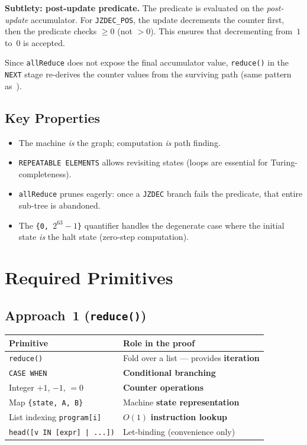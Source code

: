 \documentclass[11pt,a4paper]{article}
\begin{document}
\textbf{Subtlety: post-update predicate.}
The predicate is evaluated on the \emph{post-update} accumulator. For
\texttt{JZDEC\_POS}, the update decrements the counter first, then the
predicate checks $\geq 0$ (not $> 0$). This ensures that decrementing
from~$1$ to~$0$ is accepted.

Since \texttt{allReduce} does not expose the final accumulator value,
\texttt{reduce()} in the \texttt{NEXT} stage re-derives the counter
values from the surviving path
(same pattern as~\cite{evblog}).

\subsection{Key Properties}

\begin{itemize}[leftmargin=1.5em]
  \item The machine \emph{is} the graph; computation \emph{is} path finding.
  \item \texttt{REPEATABLE ELEMENTS} allows revisiting states (loops are
        essential for Turing-completeness).
  \item \texttt{allReduce} prunes eagerly: once a \texttt{JZDEC} branch
        fails the predicate, that entire sub-tree is abandoned.
  \item The \texttt{\{0, $2^{63}{-}1$\}} quantifier handles the
        degenerate case where the initial state \emph{is} the halt state
        (zero-step computation).
\end{itemize}


\section{Required Primitives}

\subsection{Approach~1 (\texttt{reduce()})}

\begin{center}
\begin{tabular}{@{}lp{8.5cm}@{}}
\toprule
\textbf{Primitive} & \textbf{Role in the proof} \\
\midrule
\texttt{reduce()} & Fold over a list --- provides \textbf{iteration} \\
\texttt{CASE WHEN} & \textbf{Conditional branching} \\
Integer $+1$, $-1$, $=0$ & \textbf{Counter operations} \\
Map \texttt{\{state, A, B\}} & Machine \textbf{state representation} \\
List indexing \texttt{program[i]} & $O(1)$ \textbf{instruction lookup} \\
\texttt{head([v IN [expr] | ...])} & Let-binding (convenience only) \\
\bottomrule
\end{tabular}
\end{center}
\end{document}
